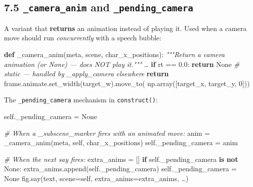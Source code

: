 \documentclass[
  11pt,
]{book}
\newenvironment{Shaded}{}{}
\newcommand{\CommentTok}[1]{\textcolor[rgb]{0.38,0.63,0.69}{\textit{#1}}}
\newcommand{\ControlFlowTok}[1]{\textcolor[rgb]{0.00,0.44,0.13}{\textbf{#1}}}
\newcommand{\DecValTok}[1]{\textcolor[rgb]{0.25,0.63,0.44}{#1}}
\newcommand{\FloatTok}[1]{\textcolor[rgb]{0.25,0.63,0.44}{#1}}
\newcommand{\KeywordTok}[1]{\textcolor[rgb]{0.00,0.44,0.13}{\textbf{#1}}}
\newcommand{\NormalTok}[1]{#1}
\newcommand{\OperatorTok}[1]{\textcolor[rgb]{0.40,0.40,0.40}{#1}}
\newcommand{\VariableTok}[1]{\textcolor[rgb]{0.10,0.09,0.49}{#1}}
\begin{document}
\subsection{\texorpdfstring{7.5 \texttt{\_camera\_anim} and
\texttt{\_pending\_camera}}{7.5 \_camera\_anim and \_pending\_camera}}\label{camera_anim-and-_pending_camera}

A variant that \textbf{returns} an animation instead of playing it. Used
when a camera move should run \emph{concurrently} with a speech bubble:

\begin{Shaded}
\begin{Highlighting}[]
\KeywordTok{def}\NormalTok{ \_camera\_anim(meta, scene, char\_x\_positions):}
    \CommentTok{"""Return a camera animation (or None) — does NOT play it."""}
\NormalTok{    …}
    \ControlFlowTok{if}\NormalTok{ rt }\OperatorTok{==} \FloatTok{0.0}\NormalTok{:}
        \ControlFlowTok{return} \VariableTok{None}    \CommentTok{\# static — handled by \_apply\_camera elsewhere}
    \ControlFlowTok{return}\NormalTok{ frame.animate.set\_width(target\_w).move\_to(}
\NormalTok{        np.array([target\_x, target\_y, }\DecValTok{0}\NormalTok{]))}
\end{Highlighting}
\end{Shaded}

The \texttt{\_pending\_camera} mechanism in \texttt{construct()}:

\begin{Shaded}
\begin{Highlighting}[]
\VariableTok{self}\NormalTok{.\_pending\_camera }\OperatorTok{=} \VariableTok{None}

\CommentTok{\# When a \_subscene\_marker fires with an animated move:}
\NormalTok{anim }\OperatorTok{=}\NormalTok{ \_camera\_anim(meta, }\VariableTok{self}\NormalTok{, char\_x\_positions)}
\VariableTok{self}\NormalTok{.\_pending\_camera }\OperatorTok{=}\NormalTok{ anim}

\CommentTok{\# When the next \textasciigrave{}say\textasciigrave{} fires:}
\NormalTok{extra\_anims }\OperatorTok{=}\NormalTok{ []}
\ControlFlowTok{if} \VariableTok{self}\NormalTok{.\_pending\_camera }\KeywordTok{is} \KeywordTok{not} \VariableTok{None}\NormalTok{:}
\NormalTok{    extra\_anims.append(}\VariableTok{self}\NormalTok{.\_pending\_camera)}
    \VariableTok{self}\NormalTok{.\_pending\_camera }\OperatorTok{=} \VariableTok{None}
\NormalTok{fig.say(text, scene}\OperatorTok{=}\VariableTok{self}\NormalTok{, extra\_anims}\OperatorTok{=}\NormalTok{extra\_anims, …)}
\end{Highlighting}
\end{Shaded}
\end{document}
